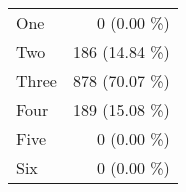 \begin{tabular}{ l  r }
One & 0 (0.00 \%)\\
Two & 186 (14.84 \%)\\
Three & 878 (70.07 \%)\\
Four & 189 (15.08 \%)\\
Five & 0 (0.00 \%)\\
Six & 0 (0.00 \%)\\
\end{tabular}
